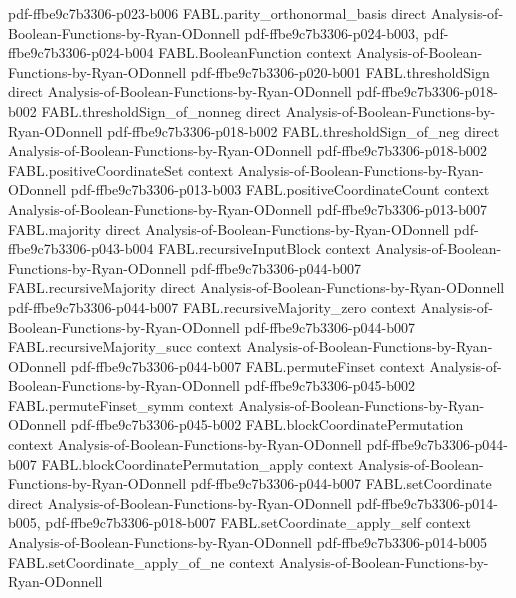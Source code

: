 \begin{theorem}
  {pdf-ffbe9c7b3306-p023-b006}
\proofstep
  {FABL.parity_orthonormal_basis}
  {direct}
  {Analysis-of-Boolean-Functions-by-Ryan-ODonnell}
  {pdf-ffbe9c7b3306-p024-b003,
    pdf-ffbe9c7b3306-p024-b004}
\proofstep
  {FABL.BooleanFunction}
  {context}
  {Analysis-of-Boolean-Functions-by-Ryan-ODonnell}
  {pdf-ffbe9c7b3306-p020-b001}
\proofstep
  {FABL.thresholdSign}
  {direct}
  {Analysis-of-Boolean-Functions-by-Ryan-ODonnell}
  {pdf-ffbe9c7b3306-p018-b002}
\proofstep
  {FABL.thresholdSign_of_nonneg}
  {direct}
  {Analysis-of-Boolean-Functions-by-Ryan-ODonnell}
  {pdf-ffbe9c7b3306-p018-b002}
\proofstep
  {FABL.thresholdSign_of_neg}
  {direct}
  {Analysis-of-Boolean-Functions-by-Ryan-ODonnell}
  {pdf-ffbe9c7b3306-p018-b002}
\proofstep
  {FABL.positiveCoordinateSet}
  {context}
  {Analysis-of-Boolean-Functions-by-Ryan-ODonnell}
  {pdf-ffbe9c7b3306-p013-b003}
\proofstep
  {FABL.positiveCoordinateCount}
  {context}
  {Analysis-of-Boolean-Functions-by-Ryan-ODonnell}
  {pdf-ffbe9c7b3306-p013-b007}
\proofstep
  {FABL.majority}
  {direct}
  {Analysis-of-Boolean-Functions-by-Ryan-ODonnell}
  {pdf-ffbe9c7b3306-p043-b004}
\proofstep
  {FABL.recursiveInputBlock}
  {context}
  {Analysis-of-Boolean-Functions-by-Ryan-ODonnell}
  {pdf-ffbe9c7b3306-p044-b007}
\proofstep
  {FABL.recursiveMajority}
  {direct}
  {Analysis-of-Boolean-Functions-by-Ryan-ODonnell}
  {pdf-ffbe9c7b3306-p044-b007}
\proofstep
  {FABL.recursiveMajority_zero}
  {context}
  {Analysis-of-Boolean-Functions-by-Ryan-ODonnell}
  {pdf-ffbe9c7b3306-p044-b007}
\proofstep
  {FABL.recursiveMajority_succ}
  {context}
  {Analysis-of-Boolean-Functions-by-Ryan-ODonnell}
  {pdf-ffbe9c7b3306-p044-b007}
\proofstep
  {FABL.permuteFinset}
  {context}
  {Analysis-of-Boolean-Functions-by-Ryan-ODonnell}
  {pdf-ffbe9c7b3306-p045-b002}
\proofstep
  {FABL.permuteFinset_symm}
  {context}
  {Analysis-of-Boolean-Functions-by-Ryan-ODonnell}
  {pdf-ffbe9c7b3306-p045-b002}
\proofstep
  {FABL.blockCoordinatePermutation}
  {context}
  {Analysis-of-Boolean-Functions-by-Ryan-ODonnell}
  {pdf-ffbe9c7b3306-p044-b007}
\proofstep
  {FABL.blockCoordinatePermutation_apply}
  {context}
  {Analysis-of-Boolean-Functions-by-Ryan-ODonnell}
  {pdf-ffbe9c7b3306-p044-b007}
\proofstep
  {FABL.setCoordinate}
  {direct}
  {Analysis-of-Boolean-Functions-by-Ryan-ODonnell}
  {pdf-ffbe9c7b3306-p014-b005,
    pdf-ffbe9c7b3306-p018-b007}
\proofstep
  {FABL.setCoordinate_apply_self}
  {context}
  {Analysis-of-Boolean-Functions-by-Ryan-ODonnell}
  {pdf-ffbe9c7b3306-p014-b005}
\proofstep
  {FABL.setCoordinate_apply_of_ne}
  {context}
  {Analysis-of-Boolean-Functions-by-Ryan-ODonnell}

\end{theorem}
